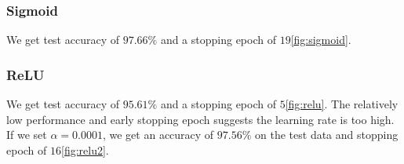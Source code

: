 \subsubsection{Sigmoid}


We get test accuracy of $97.66\%$ and a stopping epoch of $19$\cref{fig:sigmoid}.

\subsubsection{ReLU}

We get test accuracy of $95.61\%$ and a stopping epoch of $5$\cref{fig:relu}. The relatively
low performance and early stopping epoch suggests the learning rate is too high. If we set
$\alpha = 0.0001$, we get an accuracy of $97.56\%$ on the test data and stopping
epoch of $16$\cref{fig:relu2}.

